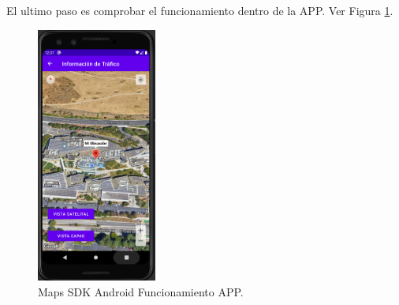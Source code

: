 \documentclass[a4paper,10pt, oneside, titlepage]{article}
\begin{document}
	\indent El ultimo paso es comprobar el funcionamiento dentro de la APP. Ver Figura \ref{Maps_SDK_Android_Funcionamiento_APP}.
	\begin{figure}[!h]
		\centering
		\includegraphics[width = 0.4\linewidth, height = 8.4cm]{Maps_SDK_Android_Funcionamiento_APP.png}
		\caption{Maps SDK Android Funcionamiento APP.}
		\label{Maps_SDK_Android_Funcionamiento_APP}
	\end{figure}
	
\end{document}
